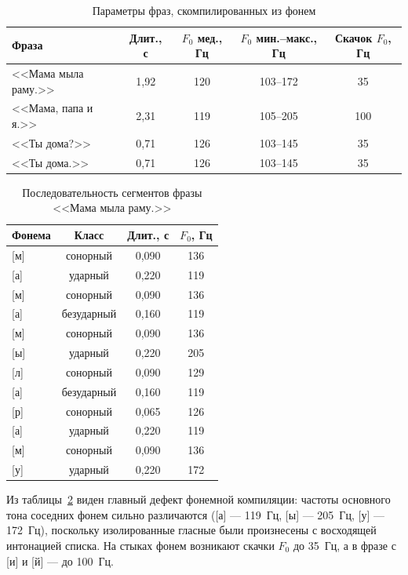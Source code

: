 \begin{table}[H]
	\centering
	\small
	\caption{Параметры фраз, скомпилированных из фонем}
	\label{tab:phonemes}
	\begin{tabular}{|l|c|c|c|c|}
		\hline
		Фраза & Длит., с & $F_0$ мед., Гц &
		$F_0$ мин.--макс., Гц & Скачок $F_0$, Гц \\
		\hline
		<<Мама мыла раму.>> & 1,92 & 120 & 103--172 & 35 \\
		\hline
		<<Мама, папа и я.>> & 2,31 & 119 & 105--205 & 100 \\
		\hline
		<<Ты дома?>> & 0,71 & 126 & 103--145 & 35 \\
		\hline
		<<Ты дома.>> & 0,71 & 126 & 103--145 & 35 \\
		\hline
	\end{tabular}
\end{table}

\begin{table}[H]
	\centering
	\small
	\caption{Последовательность сегментов фразы <<Мама мыла раму.>>}
	\label{tab:phrase1}
	\begin{tabular}{|l|c|c|c|}
		\hline
		Фонема & Класс & Длит., с & $F_0$, Гц \\
		\hline
		{[м]} & сонорный & 0,090 & 136 \\
		{[а]} & ударный & 0,220 & 119 \\
		{[м]} & сонорный & 0,090 & 136 \\
		{[а]} & безударный & 0,160 & 119 \\
		{[м]} & сонорный & 0,090 & 136 \\
		{[ы]} & ударный & 0,220 & 205 \\
		{[л]} & сонорный & 0,090 & 129 \\
		{[а]} & безударный & 0,160 & 119 \\
		{[р]} & сонорный & 0,065 & 126 \\
		{[а]} & ударный & 0,220 & 119 \\
		{[м]} & сонорный & 0,090 & 136 \\
		{[у]} & ударный & 0,220 & 172 \\
		\hline
	\end{tabular}
\end{table}

Из таблицы~\ref{tab:phrase1} виден главный дефект фонемной компиляции:
частоты основного тона соседних фонем сильно различаются ([а] --- 119~Гц,
[ы] --- 205~Гц, [у] --- 172~Гц), поскольку изолированные гласные были
произнесены с восходящей интонацией списка. На стыках фонем возникают
скачки $F_0$ до 35~Гц, а в фразе с [и] и [й] --- до 100~Гц.


